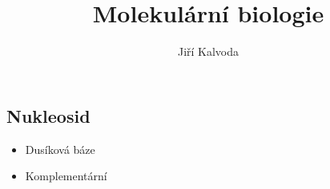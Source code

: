 \documentclass[a4]{article}
\title{Molekulární biologie}
\author{Jiří Kalvoda}
\begin{document}
\maketitle
\subsection{Nukleosid}
\begin{itemize}
	\item Dusíková báze
	\item Komplementární 
\end{itemize}
\end{document}
